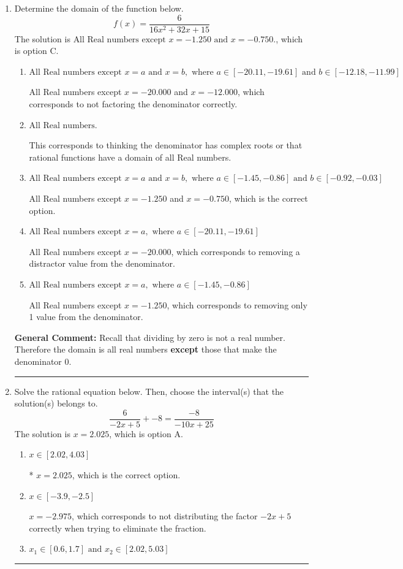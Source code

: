 \documentclass{extbook}[14pt]
\newcommand{\litem}[1]{\item #1

\rule{\textwidth}{0.4pt}}
\begin{document}
\begin{enumerate}\litem{
Determine the domain of the function below.
\[ f(x) = \frac{6}{16x^{2} +32 x + 15} \]
The solution is \( \text{All Real numbers except } x = -1.250 \text{ and } x = -0.750. \), which is option C.\begin{enumerate}[label=\Alph*.]
\item \( \text{All Real numbers except } x = a \text{ and } x = b, \text{ where } a \in [-20.11, -19.61] \text{ and } b \in [-12.18, -11.99] \)

All Real numbers except $x = -20.000$ and $x = -12.000$, which corresponds to not factoring the denominator correctly.
\item \( \text{All Real numbers.} \)

This corresponds to thinking the denominator has complex roots or that rational functions have a domain of all Real numbers.
\item \( \text{All Real numbers except } x = a \text{ and } x = b, \text{ where } a \in [-1.45, -0.86] \text{ and } b \in [-0.92, -0.03] \)

All Real numbers except $x = -1.250$ and $x = -0.750$, which is the correct option.
\item \( \text{All Real numbers except } x = a, \text{ where } a \in [-20.11, -19.61] \)

All Real numbers except $x = -20.000$, which corresponds to removing a distractor value from the denominator.
\item \( \text{All Real numbers except } x = a, \text{ where } a \in [-1.45, -0.86] \)

All Real numbers except $x = -1.250$, which corresponds to removing only 1 value from the denominator.
\end{enumerate}

\textbf{General Comment:} Recall that dividing by zero is not a real number. Therefore the domain is all real numbers \textbf{except} those that make the denominator 0.
}
\litem{
Solve the rational equation below. Then, choose the interval(s) that the solution(s) belongs to.
\[ \frac{6}{-2x + 5} + -8 = \frac{-8}{-10x + 25} \]
The solution is \( x = 2.025 \), which is option A.\begin{enumerate}[label=\Alph*.]
\item \( x \in [2.02,4.03] \)

* $x = 2.025$, which is the correct option.
\item \( x \in [-3.9,-2.5] \)

$x = -2.975$, which corresponds to not distributing the factor $-2x + 5$ correctly when trying to eliminate the fraction.
\item \( x_1 \in [0.6, 1.7] \text{ and } x_2 \in [2.02,5.03] \)


\end{enumerate}}
\end{enumerate}
\end{document}
